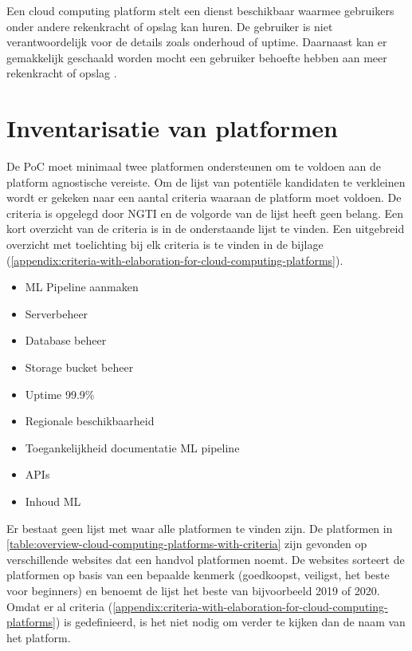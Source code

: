 
Een cloud computing platform stelt een dienst beschikbaar waarmee gebruikers onder andere rekenkracht of opslag kan huren. De gebruiker is niet verantwoordelijk voor de details zoals onderhoud of uptime. Daarnaast kan er gemakkelijk geschaald worden mocht een gebruiker behoefte hebben aan meer rekenkracht of opslag \cite{cloud-computing-wikipedia}.

\section{Inventarisatie van platformen}\label{sec:inventarisatie-van-platformen}
De PoC moet minimaal twee platformen ondersteunen om te voldoen aan de platform agnostische vereiste. Om de lijst van potentiële kandidaten te verkleinen wordt er gekeken naar een aantal criteria waaraan de platform moet voldoen. De criteria is opgelegd door NGTI en de volgorde van de lijst heeft geen belang. Een kort overzicht van de criteria is in de onderstaande lijst te vinden. Een uitgebreid overzicht met toelichting bij elk criteria is te vinden in de bijlage (\autoref{appendix:criteria-with-elaboration-for-cloud-computing-platforms}).

\begin{itemize}
  \item ML Pipeline aanmaken
  \item Serverbeheer
  \item Database beheer
  \item Storage bucket beheer
  \item Uptime 99.9\%
  \item Regionale beschikbaarheid
  \item Toegankelijkheid documentatie ML pipeline
  \item APIs
  \item Inhoud ML
\end{itemize}

Er bestaat geen lijst met waar alle platformen te vinden zijn. De platformen in \autoref{table:overview-cloud-computing-platforms-with-criteria} zijn gevonden op verschillende websites dat een handvol platformen noemt. De websites sorteert de platformen op basis van een bepaalde kenmerk (goedkoopst, veiligst, het beste voor beginners) en benoemt de lijst het beste van bijvoorbeeld 2019 of 2020. Omdat er al criteria (\ref{appendix:criteria-with-elaboration-for-cloud-computing-platforms}) is gedefinieerd, is het niet nodig om verder te kijken dan de naam van het platform.

